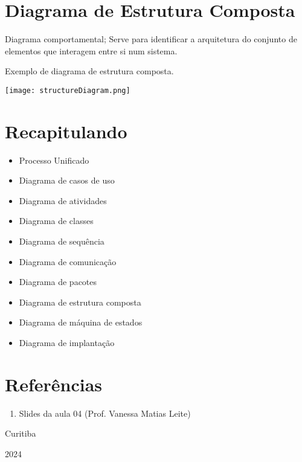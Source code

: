 \documentclass{article}
\begin{document}
\section{Diagrama de Estrutura Composta}
Diagrama comportamental; Serve para identificar a arquitetura do conjunto
de elementos que interagem entre si num sistema.

\newpage
\thispagestyle{headings}
Exemplo de diagrama de estrutura composta.

\begin{center}
    \texttt{[image: structureDiagram.png]}
\end{center}

\section{Recapitulando}
\begin{itemize}
    \item[] Processo Unificado
    \item[] Diagrama de casos de uso
    \item[] Diagrama de atividades
    \item[] Diagrama de classes
    \item[] Diagrama de sequência
    \item[] Diagrama de comunicação
    \item[] Diagrama de pacotes
    \item[] Diagrama de estrutura composta
    \item[] Diagrama de máquina de estados
    \item[] Diagrama de implantação 
\end{itemize}

\section{Referências}
\begin{enumerate}
    \item Slides da aula 04 (Prof. Vanessa Matias Leite)
\end{enumerate}

\vfill
\begin{center}
    Curitiba

    2024
\end{center}
\end{document}
